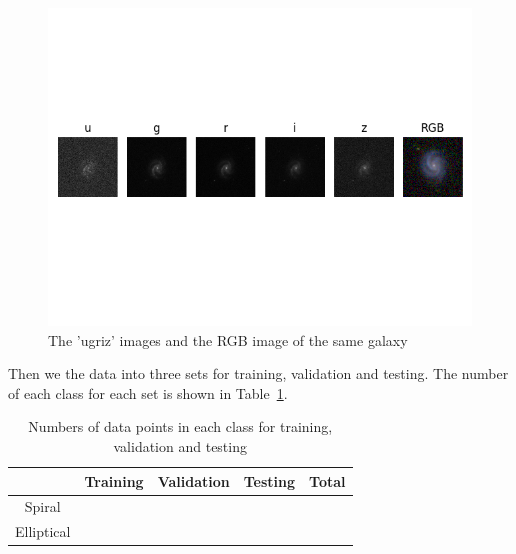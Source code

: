 \begin{figure}[h]
	\centering
	\captionsetup{justification=centering}
	\includegraphics[trim={0 4cm 0 4cm},clip]{Figures/ugriz_vs_rgb.png}
	\caption{The 'ugriz' images and the RGB image of the same galaxy}
	\label{fig:ugriz}
\end{figure}

Then we  the data into three sets for training, validation and testing. The number of each class for each set is shown in Table~\ref{tab:dataset}.
\begin{table}[]
	\centering
	\begin{tabular}{@{}ccccc@{}}
		\toprule
		& Training              & Validation            & Testing               & Total                 \\ \midrule
		\multicolumn{1}{|c|}{Spiral}     & \multicolumn{1}{c|}{} & \multicolumn{1}{c|}{} & \multicolumn{1}{c|}{} & \multicolumn{1}{c|}{} \\ \midrule
		\multicolumn{1}{|c|}{Elliptical} & \multicolumn{1}{c|}{} & \multicolumn{1}{c|}{} & \multicolumn{1}{c|}{} & \multicolumn{1}{c|}{} \\  \bottomrule
	\end{tabular}
\caption{Numbers of data points in each class for training, validation and testing}
\label{tab:dataset}
\end{table}
